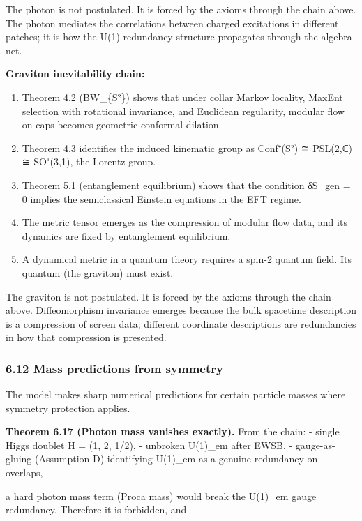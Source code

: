 \documentclass[11pt,a4paper]{article}
\theoremstyle{remark}
\providecommand{\tightlist}{%
  \setlength{\itemsep}{0pt}\setlength{\parskip}{0pt}}
\begin{document}
The photon is not postulated. It is forced by the axioms through the chain
above. The photon mediates the correlations between charged excitations in
different patches; it is how the U(1) redundancy structure propagates through
the algebra net.

\textbf{Graviton inevitability chain:}

\begin{enumerate}
\def\labelenumi{\arabic{enumi}.}
\tightlist
\item
  Theorem 4.2 (BW\_\{S²\}) shows that under collar Markov locality, MaxEnt
  selection with rotational invariance, and Euclidean regularity, modular flow
  on caps becomes geometric conformal dilation.
\item
  Theorem 4.3 identifies the induced kinematic group as
  Conf⁺(S²) ≅ PSL(2,ℂ) ≅ SO⁺(3,1), the Lorentz group.
\item
  Theorem 5.1 (entanglement equilibrium) shows that the condition
  δS\_gen = 0 implies the semiclassical Einstein equations in the EFT regime.
\item
  The metric tensor emerges as the compression of modular flow data, and its
  dynamics are fixed by entanglement equilibrium.
\item
  A dynamical metric in a quantum theory requires a spin-2 quantum field.
  Its quantum (the graviton) must exist.
\end{enumerate}

The graviton is not postulated. It is forced by the axioms through the chain
above. Diffeomorphism invariance emerges because the bulk spacetime description
is a compression of screen data; different coordinate descriptions are
redundancies in how that compression is presented.

\subsubsection{6.12 Mass predictions from symmetry}\label{mass-predictions-from-symmetry}

The model makes sharp numerical predictions for certain particle masses
where symmetry protection applies.

\textbf{Theorem 6.17 (Photon mass vanishes exactly).} From the chain:
- single Higgs doublet H = (1, 2, 1/2),
- unbroken U(1)\_em after EWSB,
- gauge-as-gluing (Assumption D) identifying U(1)\_em as a genuine redundancy
on overlaps,

a hard photon mass term (Proca mass) would break the U(1)\_em gauge
redundancy. Therefore it is forbidden, and
\end{document}
